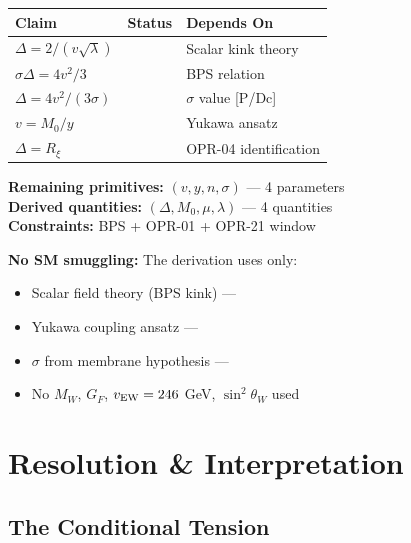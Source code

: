\begin{tcolorbox}[colback=gray!5!white, colframe=gray!50!black,
    title=\textbf{OPR-04 Verdict: CONDITIONAL CLOSURE}]
\begin{center}
\begin{tabular}{lll}
\toprule
\textbf{Claim} & \textbf{Status} & \textbf{Depends On} \\
\midrule
$\Delta = 2/(v\sqrt{\lambda})$ & \tagM{} & Scalar kink theory \\
$\sigma\Delta = 4v^2/3$ & \tagM{} & BPS relation \\
$\Delta = 4v^2/(3\sigma)$ & \tagDc{} & $\sigma$ value [P/Dc] \\
$v = M_0/y$ & \tagP{} & Yukawa ansatz \\
$\Delta = R_\xi$ & \tagP{} & OPR-04 identification \\
\bottomrule
\end{tabular}
\end{center}

\textbf{Remaining primitives:} $(v, y, n, \sigma)$ — 4 parameters \\
\textbf{Derived quantities:} $(\Delta, M_0, \mu, \lambda)$ — 4 quantities \\
\textbf{Constraints:} BPS + OPR-01 + OPR-21 window

\medskip
\textbf{No SM smuggling:} The derivation uses only:
\begin{itemize}[nosep]
    \item[$\checkmark$] Scalar field theory (BPS kink) — \tagM{}
    \item[$\checkmark$] Yukawa coupling ansatz — \tagP{}
    \item[$\checkmark$] $\sigma$ from membrane hypothesis — \tagDc{}
    \item[$\times$] No $M_W$, $G_F$, $v_{\rm EW} = 246$ GeV, $\sin^2\theta_W$ used
\end{itemize}
\end{tcolorbox}

\section{Resolution \& Interpretation}
\label{sec:ch16_resolution}

\subsection{The Conditional Tension}
\label{subsec:ch16_conditional_tension}

